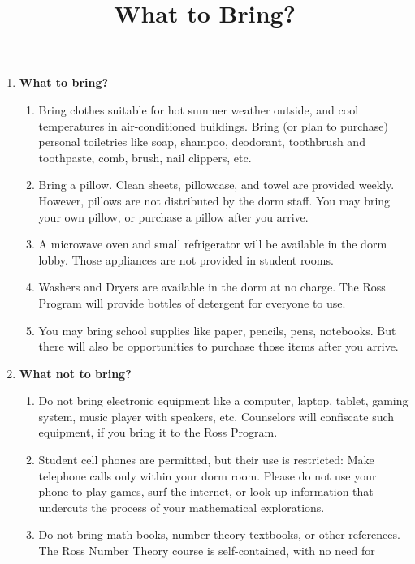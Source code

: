 \documentclass[11pt]{rossasia}
\title{What to Bring?}
\begin{document}
\maketitle
 \begin{enumerate}[label=(\arabic*),itemsep=2em,topsep=-1em]

\item \textbf{What to bring?}
 \begin{enumerate}[label=(\alph*),itemsep=0.5em,topsep=0em]
 \item Bring clothes suitable for hot summer weather outside, and cool
   temperatures in air-conditioned buildings.  Bring (or plan to
   purchase) personal toiletries like soap, shampoo, deodorant,
   toothbrush and toothpaste, comb, brush, nail clippers, etc.
 \item Bring a pillow.  Clean sheets, pillowcase, and towel are
   provided weekly.  However, pillows are not distributed by the dorm
   staff.  You may bring your own pillow, or purchase a
   pillow after you arrive.
 \item A microwave oven and small refrigerator will be available in
   the dorm lobby.  Those appliances are not provided in student
   rooms.
 \item Washers and Dryers are available in the dorm at no charge.  The
   Ross Program will provide bottles of detergent for everyone to use.
 \item You may bring school supplies like paper, pencils, pens,
   notebooks.  But there will also be opportunities to purchase those
   items after you arrive.
\end{enumerate}
\item \textbf{What not to bring?}
  \begin{enumerate}[label=(\alph*),itemsep=0.5em,topsep=0em]
  \item Do not bring electronic equipment like a computer, laptop,
    tablet, gaming system, music player with speakers, etc.  
    Counselors will confiscate such equipment, if you bring it to the
    Ross Program.
  \item Student cell phones are permitted, but their use is
    restricted: Make telephone calls only within your dorm room.
    Please do not use your phone to play games, surf the internet, or
    look up information that undercuts the process of your
    mathematical explorations.
  \item Do not bring math books, number theory textbooks, or other references.  
    The Ross Number Theory course is self-contained, with no need for 

\end{enumerate}
\end{enumerate}
\end{document}
